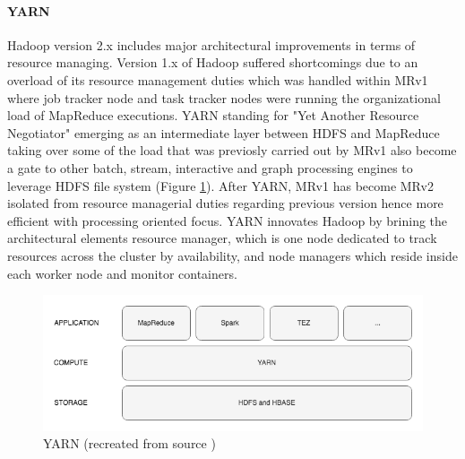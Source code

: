 \documentclass[review]{elsarticle}
\begin{document}
\paragraph{YARN}Hadoop version 2.x includes major architectural improvements in terms of resource managing. Version 1.x of Hadoop suffered shortcomings due to an overload of its resource management duties which was handled within MRv1 where job tracker node and task tracker nodes were running the organizational load of MapReduce executions. YARN standing for "Yet Another Resource Negotiator" emerging as an intermediate layer between HDFS and MapReduce taking over some of the load that was previosly carried out by MRv1 also become a gate to other batch, stream, interactive and graph processing engines to leverage HDFS file system (Figure \ref{fig:YARNoverview}). After YARN, MRv1 has become MRv2 isolated from resource managerial duties regarding previous version hence more efficient with processing oriented focus. YARN innovates Hadoop by brining the architectural elements resource manager, which is one node dedicated to track resources across the cluster by availability, and node managers which reside inside each worker node and monitor containers. 


\begin{figure}[p]
	\includegraphics[width=\textwidth]{YARNoverview}
	\caption{YARN (recreated from source \cite{dean_mapreduce_2004})}
	\label{fig:YARNoverview}
	\centering
\end{figure}
\end{document}
